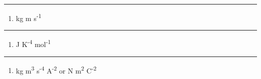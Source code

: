 \documentclass[
]{book}
\providecommand{\tightlist}{%
  \setlength{\itemsep}{0pt}\setlength{\parskip}{0pt}}
\begin{document}
\begin{center}\rule{0.5\linewidth}{0.5pt}\end{center}

\begin{enumerate}
\def\labelenumi{\arabic{enumi}.}
\setcounter{enumi}{1}
\tightlist
\item
  kg m s\textsuperscript{-1}
\end{enumerate}

\begin{center}\rule{0.5\linewidth}{0.5pt}\end{center}

\begin{enumerate}
\def\labelenumi{\arabic{enumi}.}
\setcounter{enumi}{2}
\tightlist
\item
  J K\textsuperscript{-4} mol\textsuperscript{-1}
\end{enumerate}

\begin{center}\rule{0.5\linewidth}{0.5pt}\end{center}

\begin{enumerate}
\def\labelenumi{\arabic{enumi}.}
\setcounter{enumi}{3}
\tightlist
\item
  kg m\textsuperscript{3} s\textsuperscript{-4} A\textsuperscript{-2} or N m\textsuperscript{2} C\textsuperscript{-2}
\end{enumerate}

  
\end{document}
